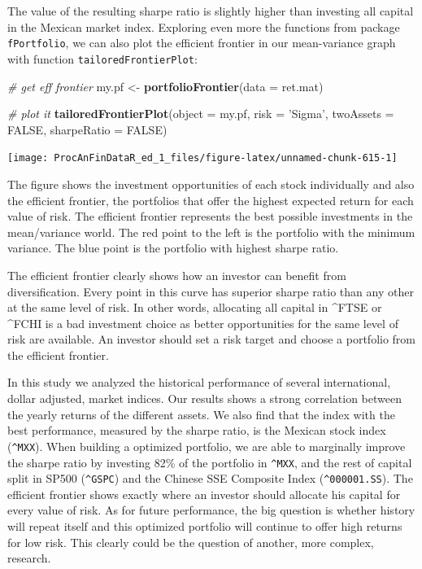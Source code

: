 \documentclass[11pt,]{book}
\newenvironment{Shaded}{\begin{snugshade}}{\end{snugshade}}
\newcommand{\KeywordTok}[1]{\textcolor[rgb]{0.27,0.27,0.27}{\textbf{#1}}}
\newcommand{\DataTypeTok}[1]{\textcolor[rgb]{0.27,0.27,0.27}{#1}}
\newcommand{\StringTok}[1]{\textcolor[rgb]{0.5,0.5,0.5}{#1}}
\newcommand{\CommentTok}[1]{\textcolor[rgb]{0.56,0.35,0.01}{\textit{#1}}}
\newcommand{\OtherTok}[1]{\textcolor[rgb]{0.56,0.35,0.01}{#1}}
\newcommand{\NormalTok}[1]{#1}
\begin{document}
The value of the resulting sharpe ratio is slightly higher than
investing all capital in the Mexican market index. Exploring even more
the functions from package \texttt{fPortfolio}, we can also plot the
efficient frontier in our mean-variance graph with function
\texttt{tailoredFrontierPlot}:

\begin{Shaded}
\begin{Highlighting}[]
\CommentTok{# get eff frontier}
\NormalTok{my.pf <-}\StringTok{ }\KeywordTok{portfolioFrontier}\NormalTok{(}\DataTypeTok{data =}\NormalTok{ ret.mat)}

\CommentTok{# plot it}
\KeywordTok{tailoredFrontierPlot}\NormalTok{(}\DataTypeTok{object =}\NormalTok{ my.pf, }
                     \DataTypeTok{risk =} \StringTok{'Sigma'}\NormalTok{, }
                     \DataTypeTok{twoAssets =} \OtherTok{FALSE}\NormalTok{, }
                     \DataTypeTok{sharpeRatio =} \OtherTok{FALSE}\NormalTok{)}
\end{Highlighting}
\end{Shaded}

\begin{center}\texttt{[image: ProcAnFinDataR\_ed\_1\_files/figure-latex/unnamed-chunk-615-1]} \end{center}

The figure shows the investment opportunities of each stock individually
and also the efficient frontier, the portfolios that offer the highest
expected return for each value of risk. The efficient frontier
represents the best possible investments in the mean/variance world. The
red point to the left is the portfolio with the minimum variance. The
blue point is the portfolio with highest sharpe ratio.

The efficient frontier clearly shows how an investor can benefit from
diversification. Every point in this curve has superior sharpe ratio
than any other at the same level of risk. In other words, allocating all
capital in \^{}FTSE or \^{}FCHI is a bad investment choice as better
opportunities for the same level of risk are available. An investor
should set a risk target and choose a portfolio from the efficient
frontier.

In this study we analyzed the historical performance of several
international, dollar adjusted, market indices. Our results shows a
strong correlation between the yearly returns of the different assets.
We also find that the index with the best performance, measured by the
sharpe ratio, is the Mexican stock index (\texttt{\^{}MXX}). When
building a optimized portfolio, we are able to marginally improve the
sharpe ratio by investing 82\% of the portfolio in \texttt{\^{}MXX}, and
the rest of capital split in SP500 (\texttt{\^{}GSPC}) and the Chinese
SSE Composite Index (\texttt{\^{}000001.SS}). The efficient frontier
shows exactly where an investor should allocate his capital for every
value of risk. As for future performance, the big question is whether
history will repeat itself and this optimized portfolio will continue to
offer high returns for low risk. This clearly could be the question of
another, more complex, research.
\end{document}
